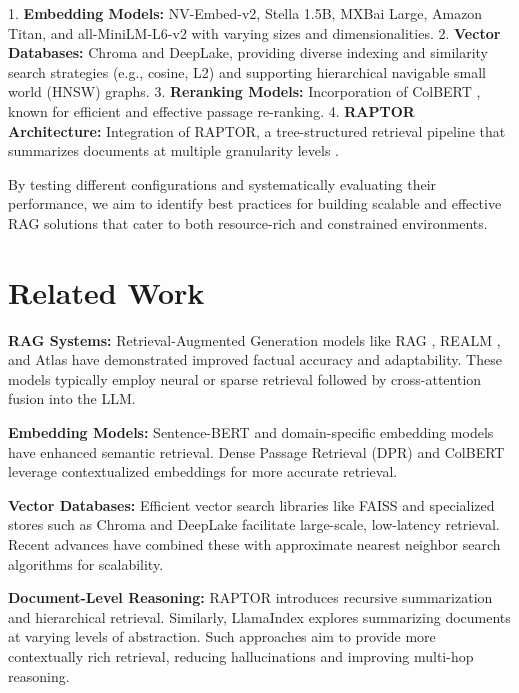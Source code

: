 \documentclass{scrartcl}
\begin{document}
1. \textbf{Embedding Models:} NV-Embed-v2, Stella 1.5B, MXBai Large, Amazon Titan, and all-MiniLM-L6-v2 with varying sizes and dimensionalities.
2. \textbf{Vector Databases:} Chroma and DeepLake, providing diverse indexing and similarity search strategies (e.g., cosine, L2) and supporting hierarchical navigable small world (HNSW) graphs.
3. \textbf{Reranking Models:} Incorporation of ColBERT \cite{khattab2020colbert}, known for efficient and effective passage re-ranking.
4. \textbf{RAPTOR Architecture:} Integration of RAPTOR, a tree-structured retrieval pipeline that summarizes documents at multiple granularity levels \cite{wu2021recursively, raptor2024}.

By testing different configurations and systematically evaluating their performance, we aim to identify best practices for building scalable and effective RAG solutions that cater to both resource-rich and constrained environments.

\section{Related Work}

\textbf{RAG Systems:} Retrieval-Augmented Generation models like RAG \cite{lewis2020retrieval}, REALM \cite{guu2020realm}, and Atlas \cite{izacard2022atlas} have demonstrated improved factual accuracy and adaptability. These models typically employ neural or sparse retrieval followed by cross-attention fusion into the LLM. 

\textbf{Embedding Models:} Sentence-BERT \cite{reimers2019sentence} and domain-specific embedding models have enhanced semantic retrieval. Dense Passage Retrieval (DPR) \cite{karpukhin2020dense} and ColBERT \cite{khattab2020colbert} leverage contextualized embeddings for more accurate retrieval.

\textbf{Vector Databases:} Efficient vector search libraries like FAISS \cite{johnson2019billion} and specialized stores such as Chroma and DeepLake facilitate large-scale, low-latency retrieval. Recent advances have combined these with approximate nearest neighbor search algorithms for scalability.

\textbf{Document-Level Reasoning:} RAPTOR \cite{wu2021recursively, raptor2024} introduces recursive summarization and hierarchical retrieval. Similarly, LlamaIndex \cite{liu2022llamaindex} explores summarizing documents at varying levels of abstraction. Such approaches aim to provide more contextually rich retrieval, reducing hallucinations and improving multi-hop reasoning.
\end{document}
